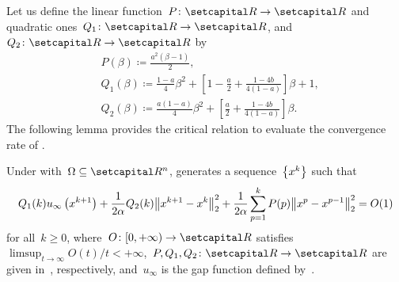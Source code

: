 \documentclass[../main]{subfiles}
\begin{document}
Let us define the linear function~$P \colon \setR \to \setR$ and quadratic ones~$Q_1 \colon \setR \to \setR$, and~$Q_2 \colon \setR \to \setR$ by
\begin{equation} \label{eq:P Q}
    \begin{aligned}
         & P(\beta) \coloneqq \frac{a^2 (\beta - 1)}{2},                                                                        \\
         & Q_1(\beta) \coloneqq \frac{1 - a}{4} \beta^2 + \left[ 1 - \frac{a}{2} + \frac{1 - 4 b}{4 (1 - a)} \right] \beta + 1, \\
         & Q_2(\beta) \coloneqq \frac{a (1 - a)}{4} \beta^2 + \left[ \frac{a}{2} + \frac{1 - 4 b}{4 (1 - a)} \right] \beta
        .\end{aligned}
\end{equation}
The following lemma provides the critical relation to evaluate the convergence rate of .
\begin{lemma} 
    Under  with~$\Omega \subseteq \setR^n$,  generates a sequence~$\set*{x^k}$ such that
    \begin{equation}
        Q_1(k) u_\infty\left(x^{k + 1}\right) + \frac{1}{2 \alpha} Q_2(k) \norm*{x^{k + 1} - x^k}_2^2 + \frac{1}{2 \alpha} \sum_{p = 1}^{k} P(p) \norm*{x^p - x^{p - 1}}_2^2 = O(1)
    \end{equation}
    for all~$k \ge 0$, where~$O \colon [0, +\infty) \to \setR$ satisfies~$\limsup_{t \to \infty} O(t) / t < + \infty$,~$P, Q_1, Q_2 \colon \setR \to \setR$ are given in~, respectively, and~$u_\infty$ is the gap function defined by~.
\end{lemma}
\end{document}
